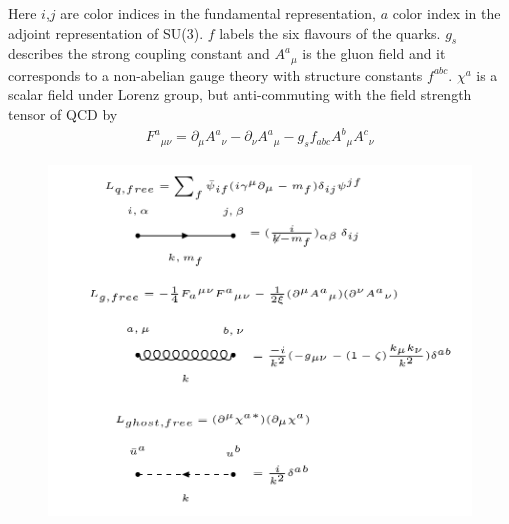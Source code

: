 Here $i$,$j$ are color indices in the fundamental representation, $a$  color index in the adjoint representation of SU(3). $f$ labels the six flavours of the quarks. $ g_s $ describes the strong coupling constant and $ {A^a}_{\mu} $ is the gluon field and it corresponds to a non-abelian gauge theory with structure constants $ f^{abc} $. $ {\chi^a} $ is a scalar field under Lorenz group, but anti-commuting with the field strength tensor of QCD  by \cite{Schwartz:2013pla, peskin2018introduction}
\begin{equation}
\begin{split}
{F^a}_{\mu \nu}= \partial_\mu {A^a}_{\nu}-\partial_\nu {A^a}_{\mu}-g_s f_{abc} {A^b}_{\mu} {A^c}_{\nu}
\end{split}
\end{equation}

\begin{figure}[h!]
\hspace{-1cm}
\includegraphics[scale=0.7]{images/Intro/Lfree.png}
\end{figure}

